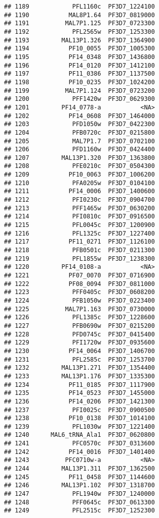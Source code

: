 \documentclass[12pt, a4paper]{article}\usepackage[]{graphicx}\usepackage[]{color}
\makeatletter
\newenvironment{kframe}{%
 \def\at@end@of@kframe{}%
 \ifinner\ifhmode%
  \def\at@end@of@kframe{\end{minipage}}%
  \begin{minipage}{\columnwidth}%
 \fi\fi%
 \def\FrameCommand##1{\hskip\@totalleftmargin \hskip-\fboxsep
 \colorbox{shadecolor}{##1}\hskip-\fboxsep
     \hskip-\linewidth \hskip-\@totalleftmargin \hskip\columnwidth}%
 \MakeFramed {\advance\hsize-\width
   \@totalleftmargin\z@ \linewidth\hsize
   \@setminipage}}%
 {\par\unskip\endMakeFramed%
 \at@end@of@kframe}
\newenvironment{knitrout}{}{} %
\makeatother
\begin{document}
\begin{knitrout}
\begin{kframe}
\begin{verbatim}
## 1189            PFL1160c  PF3D7_1224100
## 1190           MAL8P1.64  PF3D7_0819000
## 1191          MAL7P1.125  PF3D7_0723300
## 1192            PFL2565w  PF3D7_1253300
## 1193         MAL13P1.326  PF3D7_1364900
## 1194           PF10_0055  PF3D7_1005300
## 1195           PF14_0348  PF3D7_1436800
## 1196           PF14_0120  PF3D7_1412100
## 1197           PF11_0386  PF3D7_1137500
## 1198           PF10_0235  PF3D7_1024200
## 1199          MAL7P1.124  PF3D7_0723200
## 1200            PFF1420w  PF3D7_0629300
## 1201         PF14_0778-a           <NA>
## 1202           PF14_0608  PF3D7_1464000
## 1203            PFD1050w  PF3D7_0422300
## 1204            PFB0720c  PF3D7_0215800
## 1205            MAL7P1.7  PF3D7_0702100
## 1206            PFD1160w  PF3D7_0424400
## 1207         MAL13P1.320  PF3D7_1363800
## 1208            PFE0210c  PF3D7_0504300
## 1209           PF10_0063  PF3D7_1006200
## 1210            PFA0205w  PF3D7_0104100
## 1211           PF14_0006  PF3D7_1400600
## 1212            PFI0230c  PF3D7_0904700
## 1213            PFF1465w  PF3D7_0630200
## 1214            PFI0810c  PF3D7_0916500
## 1215            PFL0045c  PF3D7_1200900
## 1216            PFL1325c  PF3D7_1227400
## 1217           PF11_0271  PF3D7_1126100
## 1218            PFB0501c  PF3D7_0211300
## 1219            PFL1855w  PF3D7_1238300
## 1220         PF14_0108-a           <NA>
## 1221           PF07_0070  PF3D7_0716900
## 1222           PF08_0094  PF3D7_0811000
## 1223            PFF0405c  PF3D7_0608200
## 1224            PFB1050w  PF3D7_0223400
## 1225          MAL7P1.163  PF3D7_0730000
## 1226            PFL1385c  PF3D7_1228600
## 1227            PFB0690w  PF3D7_0215200
## 1228            PFD0745c  PF3D7_0415400
## 1229            PFI1720w  PF3D7_0935600
## 1230           PF14_0064  PF3D7_1406700
## 1231            PFL2585c  PF3D7_1253700
## 1232         MAL13P1.271  PF3D7_1354400
## 1233         MAL13P1.176  PF3D7_1335300
## 1234           PF11_0185  PF3D7_1117900
## 1235           PF14_0523  PF3D7_1455000
## 1236           PF14_0206  PF3D7_1421300
## 1237            PFI0025c  PF3D7_0900500
## 1238           PF10_0138  PF3D7_1014100
## 1239            PFL1030w  PF3D7_1221400
## 1240      MAL6_tRNA_Ala1  PF3D7_0620800
## 1241            PFC0570c  PF3D7_0313600
## 1242           PF14_0016  PF3D7_1401400
## 1243          PFC0710w-a           <NA>
## 1244         MAL13P1.311  PF3D7_1362500
## 1245           PF11_0458  PF3D7_1144600
## 1246         MAL13P1.102  PF3D7_1318700
## 1247            PFL1940w  PF3D7_1240000
## 1248            PFF0645c  PF3D7_0613300
## 1249            PFL2515c  PF3D7_1252300

\end{verbatim}
\end{kframe}
\end{knitrout}
\end{document}
